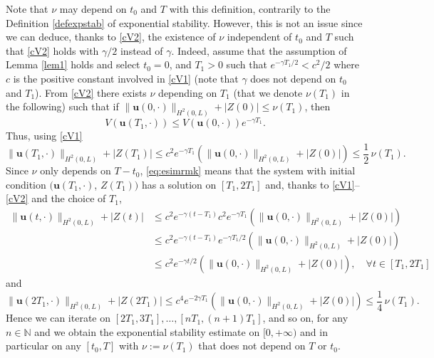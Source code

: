 \begin{rmk}
Note that $\nu$ may depend on $t_{0}$ and $T$ with this definition, contrarily to the Definition \ref{defexpstab} of exponential stability. However, this is not an issue since we can deduce, thanks to \eqref{cV2}, the existence of $\nu$ independent of $t_{0}$ and $T$ such that \eqref{cV2} holds with $\gamma/2$ instead of $\gamma$. Indeed, assume that the assumption of Lemma \ref{lem1} holds and select $t_{0}=0$, and $T_{1}>0$ such that $e^{-\gamma T_{1}/2}<c^{2}/2$ where $c$ is the positive constant involved in \eqref{cV1} (note that $\gamma$ does not depend on $t_{0}$ and $T_{1}$). From \eqref{cV2} there exists $\nu$ depending on $T_{1}$ (that we denote $\nu(T_{1})$ in the following) such that if $\lVert \boldsymbol{u}({0},\cdot)\rVert_{H^{2}(0,L)}+|Z({0})|\leq {\nu}(T_{1})$, then
\begin{equation*}
V(\boldsymbol{u}(T_{1},\cdot))\leq V(\boldsymbol{u}(0,\cdot))e^{-\gamma T_{1}}.
\end{equation*}
Thus, using \eqref{cV1}
\begin{equation}
\label{eq:esimrmk}
\lVert \boldsymbol{u}(T_{1},\cdot)\rVert_{H^{2}(0,L)}+|Z(T_{1})|\leq c^{2}e^{-\gamma T_{1}}\left(\lVert \boldsymbol{u}({0},\cdot)\rVert_{H^{2}(0,L)}+|Z({0})|\right)\leq \frac{1}{2}\,\nu (T_{1}).
\end{equation}
Since $\nu$ only depends on $T-t_{0}$, \eqref{eq:esimrmk} means that the system with initial condition $(\boldsymbol{u}(T_{1},\cdot)$, $Z(T_{1}))$ has a solution on $[T_{1},2T_{1}]$ and, thanks to \eqref{cV1}--\eqref{cV2} and the choice of $T_{1}$,
\begin{equation*}
\begin{split}
\lVert \boldsymbol{u}(t,\cdot)\rVert_{H^{2}(0,L)}+|Z(t)|&\leq c^{2}e^{-\gamma(t-T_{1})}c^{2}e^{-\gamma T_{1}}\left(\lVert \boldsymbol{u}({0},\cdot)\rVert_{H^{2}(0,L)}+|Z({0})|\right)\\
&\leq c^{2}e^{-\gamma(t-T_{1})}e^{-\gamma T_{1}/2}\left(\lVert \boldsymbol{u}({0},\cdot)\rVert_{H^{2}(0,L)}+|Z({0})|\right)\\
&\leq c^{2}e^{-\gamma t/2}\left(\lVert \boldsymbol{u}({0},\cdot)\rVert_{H^{2}(0,L)}+|Z({0})|\right),\quad\forall t\in[T_{1},2T_{1}]
\end{split}
\end{equation*}
and
\begin{equation*}
\lVert \boldsymbol{u}(2T_{1},\cdot)\rVert_{H^{2}(0,L)}+|Z(2T_{1})|\leq c^{4}e^{-2\gamma T_{1}}\left(\lVert \boldsymbol{u}({0},\cdot)\rVert_{H^{2}(0,L)}+|Z({0})|\right)\leq \frac{1}{4}\,\nu (T_{1}).
\end{equation*}
Hence we can iterate on $[2T_{1}, 3T_{1}],\dots,[nT_{1},(n+1)T_{1}]$, and so on, for any $n\in\mathbb{N}$ and we obtain the exponential stability estimate on $[0,+\infty)$ and in particular on any $[t_{0},T]$ with $\nu := \nu(T_{1})$ that does not depend on $T$ or $t_{0}$.
\end{rmk}

